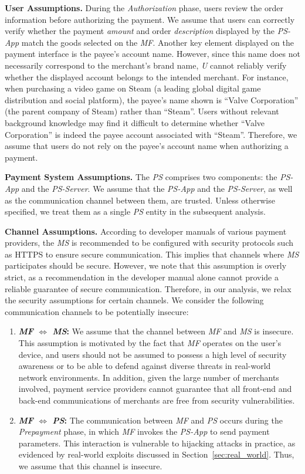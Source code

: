 \textbf{User Assumptions.}
During the \emph{Authorization} phase, users review the order information before authorizing the payment.
We assume that users can correctly verify whether the payment \emph{amount} and order \emph{description} displayed by the \emph{PS-App} match the goods selected on the \emph{MF}.
Another key element displayed on the payment interface is the payee's account name. 
However, since this name does not necessarily correspond to the merchant's brand name, \emph{U} cannot reliably verify whether the displayed account belongs to the intended merchant.
For instance, when purchasing a video game on Steam (a leading global digital game distribution and social platform), the payee's name shown is ``Valve Corporation'' (the parent company of Steam) rather than ``Steam''.
Users without relevant background knowledge may find it difficult to determine whether ``Valve Corporation'' is indeed the payee account associated with ``Steam''.
Therefore, we assume that users do not rely on the payee's account name when authorizing a payment.

\textbf{Payment System Assumptions.}
The \emph{PS} comprises two components: the \emph{PS-App} and the \emph{PS-Server}.  
We assume that the \emph{PS-App} and the \emph{PS-Server}, as well as the communication channel between them, are trusted. 
Unless otherwise specified, we treat them as a single \emph{PS} entity in the subsequent analysis.

\textbf{Channel Assumptions.}
According to developer manuals of various payment providers, the \emph{MS} is recommended to be configured with security protocols such as HTTPS to ensure secure communication. 
This implies that channels where \emph{MS} participates should be secure.
However, we note that this assumption is overly strict, as a recommendation in the developer manual alone cannot provide a reliable guarantee of secure communication. 
Therefore, in our analysis, we relax the security assumptions for certain channels.
We consider the following communication channels to be potentially insecure:
\begin{enumerate}[leftmargin=*]
\item[\Rom{1}.] \textbf{\emph{MF} $\Longleftrightarrow$ \emph{MS}:}
  We assume that the channel between \emph{MF} and \emph{MS} is insecure.
  This assumption is motivated by the fact that \emph{MF} operates on the user's device, and users should not be assumed to possess a high level of security awareness or to be able to defend against diverse threats in real-world network environments.
  In addition, given the large number of merchants involved, payment service providers cannot guarantee that all front-end and back-end communications of merchants are free from security vulnerabilities.
\item[\Rom{2}.] \textbf{\emph{MF} $\Longleftrightarrow$ \emph{PS}:}
  The communication between \emph{MF} and \emph{PS} occurs during the \emph{Prepayment} phase, in which \emph{MF} invokes the \emph{PS-App} to send payment parameters.
  This interaction is vulnerable to hijacking attacks in practice, as evidenced by real-world exploits discussed in Section~\ref{sec:real_world}.
  Thus, we assume that this channel is insecure.
\end{enumerate}

